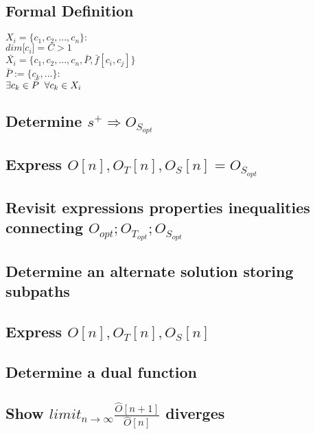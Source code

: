 \documentclass[11pt]{article}
\begin{document}
\subsection{Formal Definition}
\begin{center}
$
X_i = \{ c_1,c_2,...,c_n \} :
$
\\ \vspace{2mm}
$
dim\lbrack c_i \rbrack = C > 1
$
\\ \vspace{4mm} 
$
\bar{X_i} = \{ c_1,c_2,...,c_n,\bar{P},\bar{f}[c_i,c_j] \}
$
\\ \vspace{2mm}
$
\bar{P} := \{c_k,...\} :
$
\\ \vspace{2mm}
$
\exists c_k \in \bar{P} \hspace{2mm} \forall c_k \in X_i
$
\end{center}

\subsection{Determine $s^+ \Longrightarrow O_{S_{opt}}$}
\subsection{Express $O[n],O_T[n],O_S[n] =  O_{S_{opt}}$}
\subsection{Revisit expressions properties inequalities connecting $O_{opt}; O_{T_{opt}}; O_{S_{opt}}$}
\subsection{Determine an alternate solution storing subpaths}
\subsection{Express $O[n],O_T[n],O_S[n]$}
\subsection{Determine a dual function}
\subsection{Show $limit_{n \rightarrow \infty} \frac{\hat{O}[n+1]}{\hat{O}[n]}$ \hspace{1mm} diverges}
\end{document}
